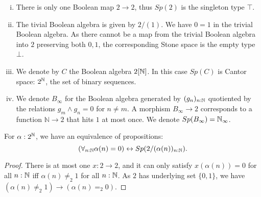 \begin{example}
  \label{boolean-algebra-examples}
  \begin{enumerate}[(i)]
  \item There is only one Boolean map $2\to 2$, thus $Sp(2)$ is the singleton type $\top$. 
  \item   
    The tivial Boolean algebra is given by $2/(1)$. 
    We have $0=1$ in the trivial Boolean algebra. 
    As there cannot be a map from the trivial Boolean algebra into $2$ preserving both $0,1$, 
    the corresponding Stone space is the empty type $\bot$.
  \item\label{ExampleBAunderCantor}   
    We denote by $C$ the Boolean algebra $2[\mathbb{N}]$.
    In this case $Sp(C)$ is Cantor space: $2^{\mathbb{N}}$, the set of binary sequences. 
  \item\label{ExampleBAunderNinfty}
    We denote $B_\infty$ for the Boolean algebra generated by 
    $(g_n)_{n:\mathbb{N}}$ quotiented by the relations $g_m \wedge g_n = 0$ for ${n\neq m}$.
    A morphism $B_\infty\to 2$ corresponds to a function 
    $\mathbb N \to 2$ that hits $1$ at most once. 
    We denote $Sp(B_\infty) = \mathbb{N}_{\infty}$. 
  \end{enumerate}
\end{example}

\begin{lemma}\label{ClosedPropAsSpectrum}
  For $\alpha:2^{\mathbb{N}}$, we have an equivalence of propositions: 
  $$
    (\forall_{n:\mathbb{N}} \alpha(n) = 0 )\leftrightarrow Sp(2/(\alpha(n))_{n:\mathbb{N}}).
  $$
\end{lemma}
\begin{proof}
  There is at most one $x:2\to 2$, and it can only satisfy 
  $x(\alpha(n)) = 0$ for all $n:\mathbb{N}$ iff 
  $\alpha(n) \neq_2 1$ for all $n:\mathbb{N}$. 
  As $2$ has underlying set $\{0,1\}$, we have $(\alpha(n) \neq_2 1) \to (\alpha(n) =_2 0)$. 
\end{proof}

